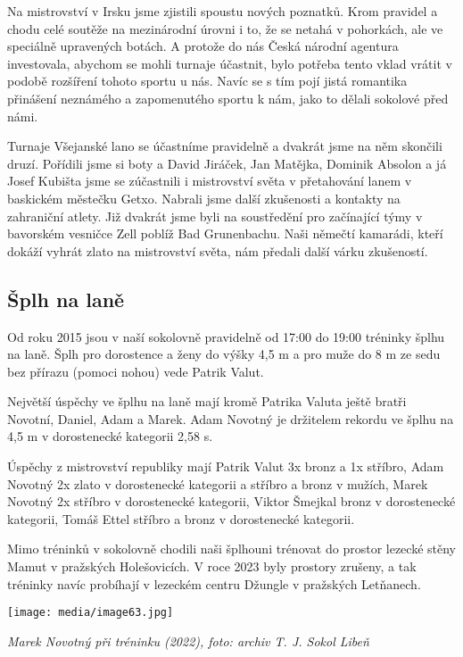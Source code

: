 Na mistrovství v Irsku jsme zjistili spoustu nových poznatků. Krom
pravidel a chodu celé soutěže na mezinárodní úrovni i to, že se netahá v
pohorkách, ale ve speciálně upravených botách. A protože do nás Česká
národní agentura investovala, abychom se mohli turnaje účastnit, bylo
potřeba tento vklad vrátit v podobě rozšíření tohoto sportu u nás. Navíc
se s tím pojí jistá romantika přinášení neznámého a zapomenutého sportu
k nám, jako to dělali sokolové před námi.

Turnaje Všejanské lano se účastníme pravidelně a dvakrát jsme na něm
skončili druzí. Pořídili jsme si boty a David Jiráček, Jan Matějka,
Dominik Absolon a já Josef Kubišta jsme se zúčastnili i mistrovství
světa v přetahování lanem v baskickém městečku Getxo. Nabrali jsme další
zkušenosti a kontakty na zahraniční atlety. Již dvakrát jsme byli na
soustředění pro začínající týmy v bavorském vesničce Zell poblíž Bad
Grunenbachu. Naši němečtí kamarádi, kteří dokáží vyhrát zlato na
mistrovství světa, nám předali další várku zkušeností.

\subsection{Šplh na laně}\label{ux161plh-na-lanux11b}

Od roku 2015 jsou v naší sokolovně pravidelně od 17:00 do 19:00 tréninky
šplhu na laně. Šplh pro dorostence a ženy do výšky 4,5 m a pro muže do 8
m ze sedu bez přírazu (pomoci nohou) vede Patrik Valut.

Největší úspěchy ve šplhu na laně mají kromě Patrika Valuta ještě bratři
Novotní, Daniel, Adam a Marek. Adam Novotný je držitelem rekordu ve
šplhu na 4,5 m v dorostenecké kategorii 2,58 s.

Úspěchy z mistrovství republiky mají Patrik Valut 3x bronz a 1x stříbro,
Adam Novotný 2x zlato v dorostenecké kategorii a stříbro a bronz v
mužích, Marek Novotný 2x stříbro v dorostenecké kategorii, Viktor
Šmejkal bronz v dorostenecké kategorii, Tomáš Ettel stříbro a bronz v
dorostenecké kategorii.

Mimo tréninků v sokolovně chodili naši šplhouni trénovat do prostor
lezecké stěny Mamut v pražských Holešovicích. V roce 2023 byly prostory
zrušeny, a tak tréninky navíc probíhají v lezeckém centru Džungle v
pražských Letňanech.

\texttt{[image: media/image63.jpg]}

\emph{Marek Novotný při tréninku (2022), foto: archiv T. J. Sokol Libeň}

